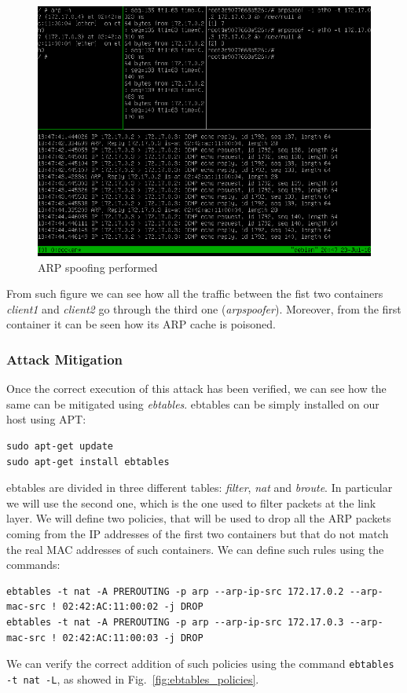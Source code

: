 \documentclass[a4paper,12pt]{article}
\newcommand{\code}[1]{\lstinline|#1|}
\def\myfig#1{Fig.~#1\xspace}
\begin{document}
\begin{figure}[ht!]
  \centerline{\includegraphics[width=1\textwidth]{ARP_performed.png}}
  \caption{ARP spoofing performed}
  \label{fig:ARP_performed}
\end{figure}

From such figure we can see how all the traffic between the fist two containers
\textit{client1} and \textit{client2} go through the third one
(\textit{arpspoofer}). Moreover, from the first container it can be seen how its
ARP cache is poisoned.

\subsubsection{Attack Mitigation}

Once the correct execution of this attack has been verified, we can see how the
same can be mitigated using \textit{ebtables}. ebtables can be simply installed
on our host using APT:
\begin{lstlisting}
sudo apt-get update
sudo apt-get install ebtables
\end{lstlisting}
ebtables are divided in three different tables: \textit{filter}, \textit{nat}
and \textit{broute}. In particular we will use the second one, which is the one
used to filter packets at the link layer. We will define two policies, that will
be used to drop all the ARP packets coming from the IP addresses of the first
two containers but that do not match the real MAC addresses of such containers.
We can define such rules using the commands: 
\begin{lstlisting}
ebtables -t nat -A PREROUTING -p arp --arp-ip-src 172.17.0.2 --arp-mac-src ! 02:42:AC:11:00:02 -j DROP
ebtables -t nat -A PREROUTING -p arp --arp-ip-src 172.17.0.3 --arp-mac-src ! 02:42:AC:11:00:03 -j DROP
\end{lstlisting}
We can verify the correct addition of such policies using the command
\code{ebtables -t nat -L}, as showed in \myfig{\ref{fig:ebtables_policies}}.
\end{document}
